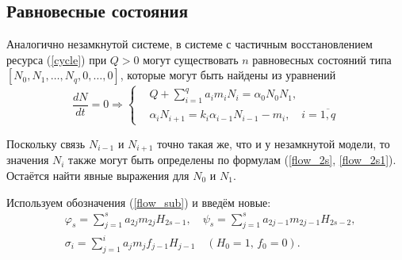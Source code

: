 \subsection{Равновесные состояния}
    Аналогично незамкнутой системе, в системе с частичным восстановлением ресурса (\ref{cycle}) при \(Q > 0\) могут существовать \( n \) равновесных состояний типа \(\left[ N_0, N_1, \ldots, N_q, 0, \ldots, 0 \right]\), которые могут быть найдены из уравнений
    \begin{equation} \label{cycle_stationary_equations}
        \frac{dN}{dt} = 0 \Rightarrow
        \left\lbrace\begin{split}
            & Q + \sum_{i=1}^{q} a_i m_i N_i = \alpha_0 N_0 N_1, \\
            & \alpha_i N_{i+1} = k_i \alpha_{i-1} N_{i-1} - m_i, \quad i=\overline{1,q}                
        \end{split}\right.
    \end{equation}

    Поскольку связь \(N_{i-1}\) и \(N_{i+1}\) точно такая же, что и у незамкнутой модели, то значения \(N_i\) также могут быть определены по формулам (\ref{flow_2s}, \ref{flow_2s1}). Остаётся найти явные выражения для \(N_0\) и \( N_1\).
    
    Используем обозначения (\ref{flow_sub}) и введём новые:
    \begin{equation}
        \begin{split}
        & \varphi_s = \sum_{j=1}^{s} a_{2j} m_{2j} H_{2s-1}, \quad 
        \psi_s = \sum_{j=1}^{s} a_{2j-1} m_{2j-1} H_{2s-2}, \\
        & \sigma_i = \sum_{j=1}^{i} a_j m_j f_{j-1} H_{j-1} \quad (H_0 = 1, \, f_0 = 0).
        \end{split}
    \end{equation}

